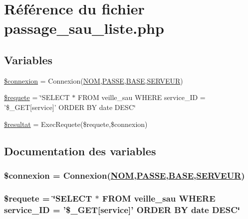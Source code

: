 \hypertarget{passage__sau__liste_8php}{
\section{R\'{e}f\'{e}rence du fichier passage\_\-sau\_\-liste.php}
\label{passage__sau__liste_8php}
}
\subsection*{Variables}
\begin{CompactItemize}
\item 
\hyperlink{passage__sau__liste_8php_a0}{\$connexion} = Connexion(\hyperlink{pma__connect_8php_a0}{NOM},\hyperlink{pma__connect_8php_a1}{PASSE},\hyperlink{pma__connect_8php_a3}{BASE},\hyperlink{pma__connect_8php_a2}{SERVEUR})
\item 
\hyperlink{passage__sau__liste_8php_a1}{\$requete} = \char`\"{}SELECT $\ast$ FROM veille\_\-sau WHERE service\_\-ID = '\$\_\-GET\mbox{[}service\mbox{]}' ORDER BY date DESC\char`\"{}
\item 
\hyperlink{passage__sau__liste_8php_a2}{\$resultat} = Exec\-Requete(\$requete,\$connexion)
\end{CompactItemize}


\subsection{Documentation des variables}
\hypertarget{passage__sau__liste_8php_a0}{
\subsubsection[\$connexion]{\setlength{\rightskip}{0pt plus 5cm}\$connexion = Connexion(\hyperlink{pma__connect_8php_a0}{NOM},\hyperlink{pma__connect_8php_a1}{PASSE},\hyperlink{pma__connect_8php_a3}{BASE},\hyperlink{pma__connect_8php_a2}{SERVEUR})}}
\label{passage__sau__liste_8php_a0}


\hypertarget{passage__sau__liste_8php_a1}{
\subsubsection[\$requete]{\setlength{\rightskip}{0pt plus 5cm}\$requete = \char`\"{}SELECT $\ast$ FROM veille\_\-sau WHERE service\_\-ID = '\$\_\-GET\mbox{[}service\mbox{]}' ORDER BY date DESC\char`\"{}}}
\label{passage__sau__liste_8php_a1}


